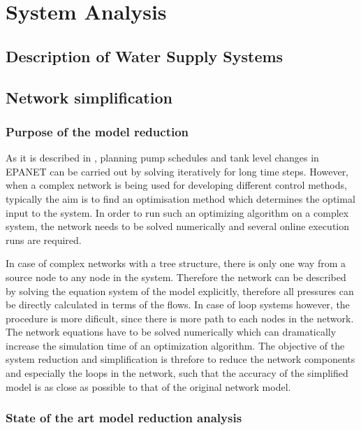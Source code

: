 
\part{System Analysis}
\label{system_analysis}

\chapter{Description of Water Supply Systems}
\label{description_of_water_supply_systems}

 





\chapter{Network simplification}
\label{network_simplification}

\section{Purpose of the model reduction}
\label{purpose_of_the_model_reduction}

As it is described in , planning pump schedules and tank level changes in EPANET can be carried out by solving iteratively for long time steps. However, when a complex network is being used for developing different control methods, typically the aim is to find an optimisation method which determines the optimal input to the system. In order to run such an optimizing algorithm on a complex system, the network needs to be solved numerically and several online execution runs are required. 

In case of complex networks with a tree structure, there is only one way from a source node to any node in the system. Therefore the network can be described by solving the equation system of the model explicitly, therefore all pressures can be directly calculated in terms of the flows. In case of loop systems however, the procedure is more dificult, since there is more path to each nodes in the network. The network equations have to be solved numerically which can dramatically increase the simulation time of an optimization algorithm. The objective of the system reduction and simplification is threfore to reduce the network components and especially the loops in the network, such that the accuracy of the simplified model is as close as possible to that of the original network model. 

\section{State of the art model reduction analysis}
\label{state_of_the_art_model_reduction_analysis}




























